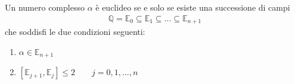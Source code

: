 \begin{teorema} \label{tfond}
Un numero complesso $\alpha$ è euclideo se e solo se esiste una successione di campi 
\begin{align*}
\mathbb{Q} = \mathbb{E}_0 \subseteq \mathbb{E}_1 \subseteq ... \subseteq  \mathbb{E}_{n+1}  
\end{align*}
\noindent
che soddisfi le due condizioni seguenti:
\begin{enumerate}
\item $\alpha \in  \mathbb{E}_{n+1}$
\item $[\mathbb{E}_{j+1}, \mathbb{E}_{j}] \leq 2 \qquad j = 0, 1, ... , n $
\end{enumerate}
\end{teorema}


